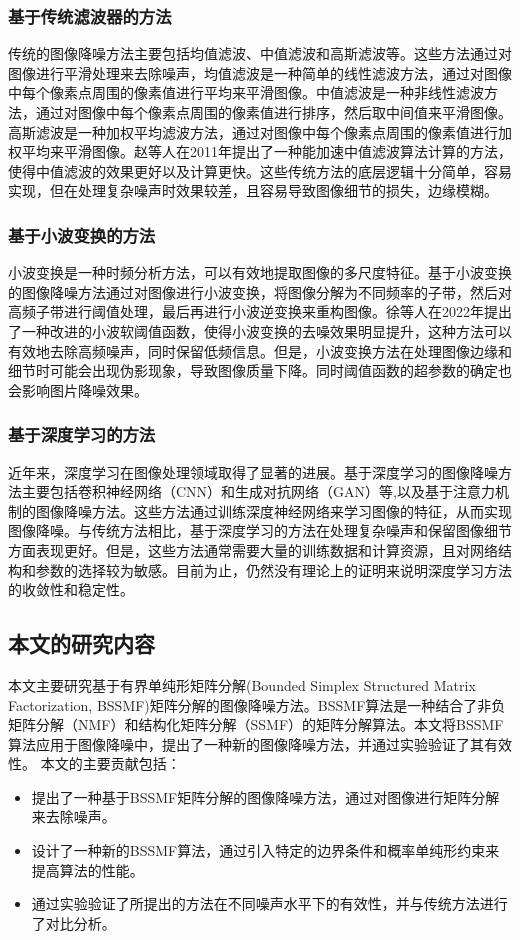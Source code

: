 \documentclass[12pt]{article}
\begin{document}
\subsubsection{基于传统滤波器的方法}
传统的图像降噪方法主要包括均值滤波、中值滤波和高斯滤波等。这些方法通过对图像进行平滑处理来去除噪声，均值滤波是一种简单的线性滤波方法，通过对图像中每个像素点周围的像素值进行平均来平滑图像。中值滤波是一种非线性滤波方法，通过对图像中每个像素点周围的像素值进行排序，然后取中间值来平滑图像。高斯滤波是一种加权平均滤波方法，通过对图像中每个像素点周围的像素值进行加权平均来平滑图像。赵等人在2011年提出了一种能加速中值滤波算法计算的方法，使得中值滤波的效果更好以及计算更快\cite{中值滤波}。这些传统方法的底层逻辑十分简单，容易实现，但在处理复杂噪声时效果较差，且容易导致图像细节的损失，边缘模糊。
\subsubsection{基于小波变换的方法}
小波变换是一种时频分析方法，可以有效地提取图像的多尺度特征。基于小波变换的图像降噪方法通过对图像进行小波变换，将图像分解为不同频率的子带，然后对高频子带进行阈值处理，最后再进行小波逆变换来重构图像。徐等人在2022年提出了一种改进的小波软阈值函数\cite{小波变换}，使得小波变换的去噪效果明显提升，这种方法可以有效地去除高频噪声，同时保留低频信息。但是，小波变换方法在处理图像边缘和细节时可能会出现伪影现象，导致图像质量下降。同时阈值函数的超参数的确定也会影响图片降噪效果。
\subsubsection{基于深度学习的方法}
近年来，深度学习在图像处理领域取得了显著的进展。基于深度学习的图像降噪方法主要包括卷积神经网络（CNN）和生成对抗网络（GAN）等\cite{深度学习去噪},以及基于注意力机制的图像降噪方法\cite{注意力机制}。这些方法通过训练深度神经网络来学习图像的特征，从而实现图像降噪。与传统方法相比，基于深度学习的方法在处理复杂噪声和保留图像细节方面表现更好。但是，这些方法通常需要大量的训练数据和计算资源，且对网络结构和参数的选择较为敏感。目前为止，仍然没有理论上的证明来说明深度学习方法的收敛性和稳定性。

\subsection{本文的研究内容}
本文主要研究基于有界单纯形矩阵分解(Bounded Simplex Structured Matrix Factorization, BSSMF)矩阵分解的图像降噪方法。BSSMF算法是一种结合了非负矩阵分解（NMF）和结构化矩阵分解（SSMF）的矩阵分解算法。本文将BSSMF算法应用于图像降噪中，提出了一种新的图像降噪方法，并通过实验验证了其有效性。
本文的主要贡献包括：
\begin{itemize}
    \item 提出了一种基于BSSMF矩阵分解的图像降噪方法，通过对图像进行矩阵分解来去除噪声。
    \item 设计了一种新的BSSMF算法，通过引入特定的边界条件和概率单纯形约束来提高算法的性能。
    \item 通过实验验证了所提出的方法在不同噪声水平下的有效性，并与传统方法进行了对比分析。
\end{itemize}
\end{document}

